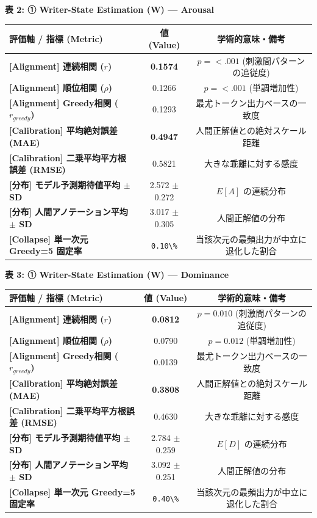 \textbf{表 2: ① Writer-State Estimation (W) — Arousal}
\begin{center}
\small
\begin{tabular}{lcc}
\toprule
\textbf{評価軸 / 指標 (Metric)} & \textbf{値 (Value)} & \textbf{学術的意味・備考} \\
\midrule
\textbf{[Alignment] 連続相関 ($r$)} & \textbf{0.1574} & $p = <.001 $ (刺激間パターンの追従度) \\
\textbf{[Alignment] 順位相関 ($\rho$)} & 0.1266 & $p = <.001 $ (単調増加性) \\
\textbf{[Alignment] Greedy相関 ($r_{greedy}$)} & 0.1293 & 最尤トークン出力ベースの一致度 \\
\textbf{[Calibration] 平均絶対誤差 (MAE)} & \textbf{0.4947} & 人間正解値との絶対スケール距離 \\
\textbf{[Calibration] 二乗平均平方根誤差 (RMSE)} & 0.5821 & 大きな乖離に対する感度 \\
\textbf{[分布] モデル予測期待値平均 $\pm$ SD} & 2.572 $\pm$ 0.272 & $E[A]$ の連続分布 \\
\textbf{[分布] 人間アノテーション平均 $\pm$ SD} & 3.017 $\pm$ 0.305 & 人間正解値の分布 \\
\textbf{[Collapse] 単一次元 Greedy=5 固定率} & \texttt{0.10\textbackslash{}\%} & 当該次元の最頻出力が中立に退化した割合 \\
\bottomrule
\end{tabular}
\end{center}


\textbf{表 3: ① Writer-State Estimation (W) — Dominance}
\begin{center}
\small
\begin{tabular}{lcc}
\toprule
\textbf{評価軸 / 指標 (Metric)} & \textbf{値 (Value)} & \textbf{学術的意味・備考} \\
\midrule
\textbf{[Alignment] 連続相関 ($r$)} & \textbf{0.0812} & $p = 0.010 $ (刺激間パターンの追従度) \\
\textbf{[Alignment] 順位相関 ($\rho$)} & 0.0790 & $p = 0.012 $ (単調増加性) \\
\textbf{[Alignment] Greedy相関 ($r_{greedy}$)} & 0.0139 & 最尤トークン出力ベースの一致度 \\
\textbf{[Calibration] 平均絶対誤差 (MAE)} & \textbf{0.3808} & 人間正解値との絶対スケール距離 \\
\textbf{[Calibration] 二乗平均平方根誤差 (RMSE)} & 0.4630 & 大きな乖離に対する感度 \\
\textbf{[分布] モデル予測期待値平均 $\pm$ SD} & 2.784 $\pm$ 0.259 & $E[D]$ の連続分布 \\
\textbf{[分布] 人間アノテーション平均 $\pm$ SD} & 3.092 $\pm$ 0.251 & 人間正解値の分布 \\
\textbf{[Collapse] 単一次元 Greedy=5 固定率} & \texttt{0.40\textbackslash{}\%} & 当該次元の最頻出力が中立に退化した割合 \\
\bottomrule
\end{tabular}
\end{center}



